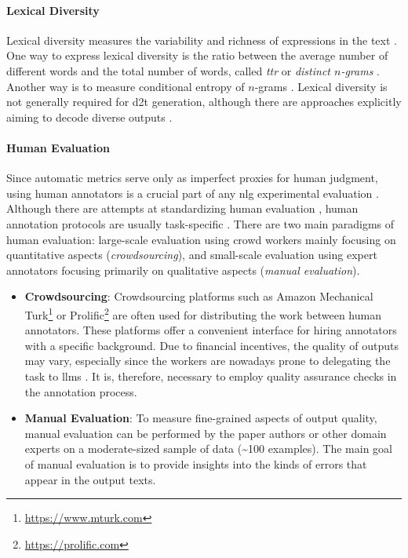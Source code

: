 {\paragraph{Lexical Diversity} Lexical diversity measures the variability and richness of expressions in the text \cite{vanmiltenburgMeasuringDiversityAutomatic2018}. One way to express lexical diversity is the ratio between the average number of different words and the total number of words, called \emph{\ac{ttr}} or \emph{distinct $n$-grams} \cite{johnson1944studies,li2016diversity}. Another way is to measure conditional entropy of $n$-grams \cite{shannon1948mathematical}.
Lexical diversity is not generally required for \ac{d2t} generation, although there are approaches explicitly aiming to decode diverse outputs \cite{hanGeneratingDiverseDescriptions2021,perlitzDiversityEnhancedTabletoText2022}.

\paragraph{Human Evaluation} Since automatic metrics serve only as imperfect proxies for human judgment, using human annotators is a crucial part of any \ac{nlg} experimental evaluation \cite{gehrmannRepairingCrackedFoundation2022}. Although there are attempts at standardizing human evaluation \cite{thomsonGoldStandardMethodology2020}, human annotation protocols are usually task-specific \cite{van2019best,belzDisentanglingPropertiesHuman2020}. There are two main paradigms of human evaluation: large-scale evaluation using crowd workers mainly focusing on quantitative aspects (\emph{crowdsourcing}), and small-scale evaluation using expert annotators focusing primarily on qualitative aspects (\emph{manual evaluation}).

\begin{itemize}
    \item \textbf{Crowdsourcing}: Crowdsourcing platforms such as Amazon Mechanical Turk\footnote{\url{https://www.mturk.com}} or Prolific\footnote{\url{https://prolific.com}} are often used for distributing the work between human annotators. These platforms offer a convenient interface for hiring annotators with a specific background. Due to financial incentives, the quality of outputs may vary, especially since the workers are nowadays prone to delegating the task to \acp{llm} \cite{veselovskyArtificialArtificialArtificial2023}. It is, therefore, necessary to employ quality assurance checks in the annotation process.
    \item \textbf{Manual Evaluation}: To measure fine-grained aspects of output quality, manual evaluation can be performed by the paper authors or other domain experts on a moderate-sized sample of data (\textasciitilde 100 examples). The main goal of manual evaluation is to provide insights into the kinds of errors that appear in the output texts.
\end{itemize}


}

